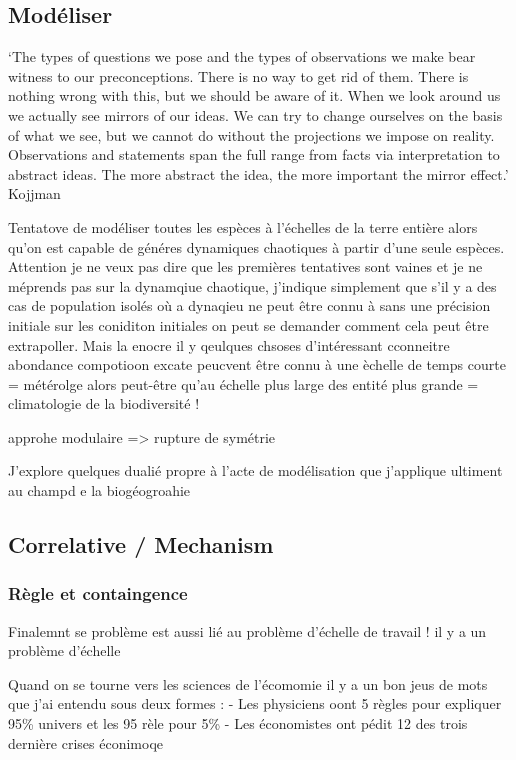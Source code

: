 \subsection{Modéliser}\label{moduxe9liser}

`The types of questions we pose and the types of observations we make
bear witness to our preconceptions. There is no way to get rid of them.
There is nothing wrong with this, but we should be aware of it. When we
look around us we actually see mirrors of our ideas. We can try to
change ourselves on the basis of what we see, but we cannot do without
the projections we impose on reality. Observations and statements span
the full range from facts via interpretation to abstract ideas. The more
abstract the idea, the more important the mirror effect.' Kojjman

Tentatove de modéliser toutes les espèces à l'échelles de la terre
entière alors qu'on est capable de généres dynamiques chaotiques à
partir d'une seule espèces. Attention je ne veux pas dire que les
premières tentatives sont vaines et je ne méprends pas sur la dynamqiue
chaotique, j'indique simplement que s'il y a des cas de population
isolés où a dynaqieu ne peut être connu à sans une précision initiale
sur les coniditon initiales on peut se demander comment cela peut être
extrapoller. Mais la enocre il y qeulques chsoses d'intéressant
cconneitre abondance compotioon excate peucvent être connu à une èchelle
de temps courte = métérolge alors peut-être qu'au échelle plus large des
entité plus grande = climatologie de la biodiversité !

approhe modulaire =\textgreater{} rupture de symétrie

J'explore quelques dualié propre à l'acte de modélisation que j'applique
ultiment au champd e la biogéogroahie

\subsection{Correlative / Mechanism}\label{correlative-mechanism}

\subsubsection{Règle et containgence}\label{ruxe8gle-et-containgence}

Finalemnt se problème est aussi lié au problème d'échelle de travail !
il y a un problème d'échelle

Quand on se tourne vers les sciences de l'écomomie il y a un bon jeus de
mots que j'ai entendu sous deux formes : - Les physiciens oont 5 règles
pour expliquer 95\% univers et les 95 rèle pour 5\% - Les économistes
ont pédit 12 des trois dernière crises éconimoqe

